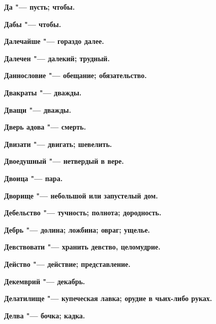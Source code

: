 \begin{multicols}{2}
\bfseries Да\normalfont{} "--- пусть; чтобы. 




\bfseries Дабы\normalfont{} "--- чтобы. 




\bfseries Далечайше\normalfont{} "--- гораздо далее. 




\bfseries Далечен\normalfont{} "--- далекий; трудный. 




\bfseries Даннословие\normalfont{} "--- обещание; обязательство. 




\bfseries Двакраты\normalfont{} "--- дважды. 




\bfseries Дващи\normalfont{} "--- дважды. 




\bfseries Дверь адова\normalfont{} "--- смерть. 




\bfseries Двизати\normalfont{} "--- двигать; шевелить. 




\bfseries Двоедушный\normalfont{} "--- нетвердый в вере. 




\bfseries Двоица\normalfont{} "--- пара. 




\bfseries Дворище\normalfont{} "--- небольшой или запустелый дом. 




\bfseries Дебельство\normalfont{} "--- тучность; полнота; дородность. 




\bfseries Дебрь\normalfont{} "--- долина; ложбина; овраг; ущелье. 




\bfseries Девствовати\normalfont{} "--- хранить девство, целомудрие. 




\bfseries Действо\normalfont{} "--- действие; представление. 




\bfseries Декемврий\normalfont{} "--- декабрь. 




\bfseries Делатилище\normalfont{} "--- купеческая лавка; орудие в чьих-либо руках. 




\bfseries Делва\normalfont{} "--- бочка; кадка. 





\end{multicols}

